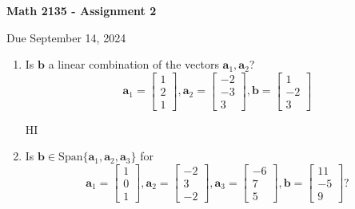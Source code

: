 \documentclass[12pt,a4paper]{amsart}
\newcommand{\ba}{\mathbf{a}}
\newcommand{\bb}{\mathbf{b}}
\begin{document}
\begin{center}
\begin{Large}
{\bf Math 2135 - Assignment 2}
\printanswers
\end{Large}

\bigskip
Due September 14, 2024
\end{center}

\thispagestyle{empty}

\bigskip




\begin{enumerate}

\item
 Is $\bb$ a linear combination of the vectors $\ba_1,\ba_2$?
 \[ \ba_1 = \left[ \begin{array}{c} 1 \\ 2 \\ 1 
\end{array} \right],
\ba_2 = \left[ \begin{array}{c} -2 \\ -3 \\ 3 
\end{array} \right],
\bb = \left[ \begin{array}{c} 1 \\ -2 \\ 3 
\end{array} \right] \]

\begin{solution}
  HI
\end{solution}




\item
 Is $\mathbf{b}\in \mathrm{Span}\{\mathbf{a}_1,\mathbf{a}_2,\mathbf{a}_3\}$ for
 \[ \mathbf{a}_1 = \left[ \begin{array}{c} 1 \\ 0 \\ 1 
\end{array} \right],
\mathbf{a}_2 = \left[ \begin{array}{c} -2 \\ 3 \\ -2 
\end{array} \right],
\mathbf{a}_3 = \left[ \begin{array}{c} -6 \\ 7 \\ 5 
\end{array} \right],
\mathbf{b} = \left[ \begin{array}{c} 11 \\ -5 \\ 9 
\end{array} \right]? \]



\end{enumerate}
\end{document}
